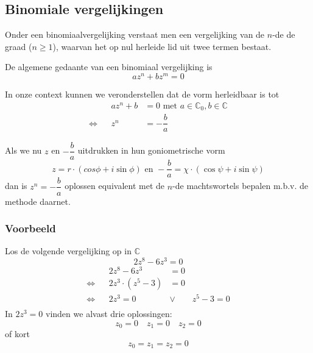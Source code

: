 \documentclass[12pt,twoside,a4]{article}
\begin{document}
\subsection{Binomiale vergelijkingen}

Onder een binomiaalvergelijking verstaat men een vergelijking van de $n$-de de graad ($n \geq 1$), waarvan het op nul herleide lid uit twee termen bestaat.

De algemene gedaante van een binomiaal vergelijking is
\[az^n + bz^m=0\]

In onze context kunnen we veronderstellen dat de vorm herleidbaar is tot
\begin{align*}
     && az^n+b &= 0 \text{ met } a\in\mathbb{C}_0, b\in\mathbb{C}\\
  \Leftrightarrow &&    z^n  &= -\dfrac{b}{a}
\end{align*}

Als we nu $z$ en $-\dfrac{b}{a}$ uitdrukken in hun goniometrische vorm
\[z=r\cdot(cos\phi + i\sin\phi) \text{ en } -\dfrac{b}{a}=\chi \cdot ( \cos\psi + i\sin\psi )\]
dan is $z^n=-\dfrac{b}{a}$ oplossen equivalent met de $n$-de machtswortels bepalen m.b.v. de methode daarnet.

\subsubsection*{Voorbeeld}

Los de volgende vergelijking op in $\mathbb{C}$
\[2z^8-6z^3=0\]
\begin{align*}
     && 2z^8-6z^3 &= 0\\
  \Leftrightarrow && 2z^3 \cdot (z^5 - 3) &= 0\\
  \Leftrightarrow && 2z^3 = 0 \qquad &\vee \qquad z^5 - 3 = 0\\
\end{align*}
In $2z^3 = 0$ vinden we alvast drie oplossingen:
\[z_0 = 0 \quad z_1 = 0 \quad z_2 = 0\]
of kort
\[z_0 = z_1 = z_2 = 0\]
\end{document}
